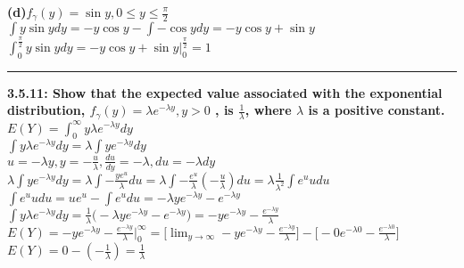 \documentclass[11pt]{article}
\newcommand\question[2]{\vspace{.25in}\hrule\textbf{#1: #2}\vspace{.5em}\vspace{.10in}}
\renewcommand\part[1]{\vspace{.10in}\textbf{(#1)}}
\begin{document}
\part{d}$f_{\gamma} (y) = \sin y, 0 \leq y \leq \frac{\pi}{2}$
\\
$
\int y \sin y dy 
= 
-y\cos y - \int - \cos y dy
=
-y \cos y + \sin y
$
\\
$
\int_{0}^{\frac{\pi}{2}} y \sin y dy 
=
-y \cos y + \sin y \Big|_{0}^{\frac{\pi}{2}}
=
1
$


\question{3.5.11}
{Show that the expected value associated with the exponential distribution,
$f_{\gamma} (y) = \lambda e^{- \lambda y},y > 0$
, is $\frac{1}{\lambda}$, where $\lambda$ is a positive constant.}
\\
$
E(Y) = \int_{0}^{\infty} y \lambda e^{- \lambda y} dy
$
\\
$
\int y \lambda e^{ - \lambda y} dy 
= 
\lambda \int y e^{- \lambda y} dy
$
\\
$
u = - \lambda y, y = -\frac{u}{\lambda},\frac{du}{dy} = - \lambda, du = - \lambda dy
$
\\
$
\lambda \int y e^{- \lambda y} dy 
= 
\lambda \int -\frac{y e^{u}}{\lambda}du
=
\lambda \int -\frac{e^{u}}{\lambda}(-\frac{u}{\lambda})du
=
\lambda \frac{1}{\lambda^{2}} \int e^{u}udu
$
\\
$
\int e^{u}udu = ue^{u} - \int e^{u}du
=
- \lambda y e^{- \lambda y} - e^{- \lambda y}
$
\\
$
\int y \lambda e^{ - \lambda y} dy 
=
\frac{1}{\lambda} \Big(- \lambda y e^{- \lambda y} - e^{- \lambda y}\Big)
=
-ye^{ - \lambda y} - \frac{e^{- \lambda y}}{\lambda}
$
\\
$
E(Y)
=
-ye^{ - \lambda y} - \frac{e^{- \lambda y}}{\lambda} \Big |_{0}^{\infty}
=
\Big[\lim_{y\to\infty} 
-ye^{ - \lambda y} - \frac{e^{- \lambda y}}{\lambda} \Big]
-
\Big[
    -0e^{ - \lambda 0} - \frac{e^{- \lambda 0}}{\lambda}
\Big]
$
\\
$
E(Y) = 0 - (-\frac{1}{\lambda}) = \frac{1}{\lambda}
$
\end{document}
